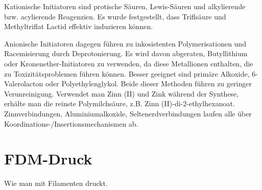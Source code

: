 \documentclass[10pt]{article}
\begin{document}
    Kationische Initiatoren sind protische Säuren, Lewis-Säuren und alkylierende bzw. acylierende Reagenzien.
    Es wurde festgestellt, dass Triflsäure und Methyltriflat Lactid effektiv induzieren können.

    Anionische Initiatoren dagegen führen zu inkosistenten Polymerisationen und Racemisierung durch Deprotonierung.
    Es wird davon abgeraten, Butyllithium oder Kronenether-Initiatoren zu verwenden, da diese Metallionen enthalten, die zu Toxizitätsproblemen führen können.
    Besser geeignet sind primäre Alkoxide, 6-Valerolacton oder Polyethylenglykol.
    Beide dieser Methoden führen zu geringer Verunreinigung.
    Verwendet man Zinn (II) und Zink während der Synthese, erhälte man die reinste Polymilchsäure, z.B. Zinn (II)-di-2-ethylhexanoat.
    Zinnverbindungen, Aluminiumalkoxide, Seltenerdverbindungen laufen alle über Koordinations-/Insertionsmechanismen ab.

    \section{FDM-Druck}
    Wie man mit Filamenten druckt.
\end{document}
